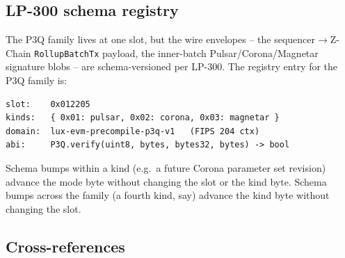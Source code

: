 \subsection{LP-300 schema registry}

The P3Q family lives at one slot, but the wire envelopes -- the
sequencer$\to$Z-Chain \texttt{RollupBatchTx} payload, the
inner-batch Pulsar/Corona/Magnetar signature blobs -- are
schema-versioned per LP-300. The registry entry for the P3Q
family is:

\begin{verbatim}
slot:    0x012205
kinds:   { 0x01: pulsar, 0x02: corona, 0x03: magnetar }
domain:  lux-evm-precompile-p3q-v1   (FIPS 204 ctx)
abi:     P3Q.verify(uint8, bytes, bytes32, bytes) -> bool
\end{verbatim}

Schema bumps within a kind (e.g.\ a future Corona parameter set
revision) advance the mode byte without changing the slot or
the kind byte. Schema bumps across the family (a fourth kind,
say) advance the kind byte without changing the slot.

\subsection{Cross-references}

